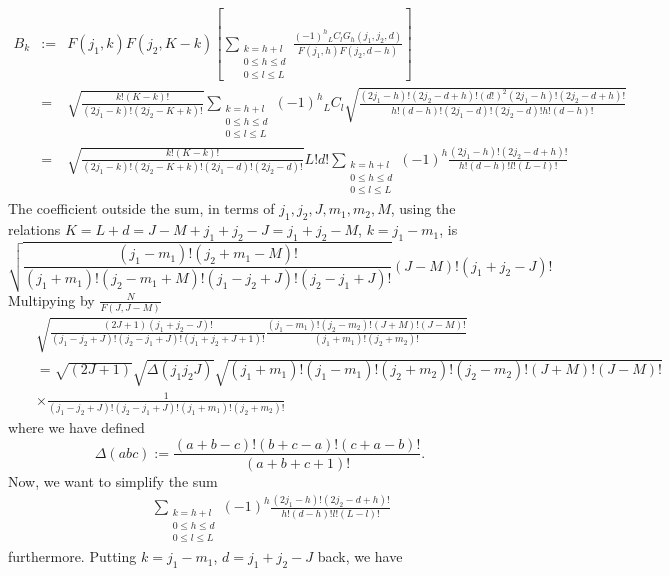 \documentclass{article}
\begin{document}
{\begin{eqnarray}
B_k & := & F(j_1,k)F(j_2,K-k) \left[ \sum_{\substack{k=h+l\\0\le h \le d\\0\le l \le L}} \frac{ (-1)^h {}_LC_{l}G_h(j_1,j_2,d) }{F(j_1,h)F(j_2,d-h)}\right] \nonumber\\
 & = & \sqrt{\frac{k!(K-k)!}{(2j_1 -k)!(2j_2-K+k)!}}  \sum_{\substack{k=h+l\\0\le h \le d\\0\le l \le L}}  (-1)^h {}_LC_{l}\sqrt{\frac{(2j_1-h)!(2j_2-d+h)!(d!)^2(2j_1-h)!(2j_2-d+h)!}{h!(d-h)!(2j_1-d)!(2j_2-d)!h!(d-h)!}}  \nonumber \\
 &=& \sqrt{\frac{k!(K-k)!}{(2j_1 -k)!(2j_2-K+k)!(2j_1-d)!(2j_2-d)!}} L!d!\sum_{\substack{k=h+l\\0\le h \le d\\0\le l \le L}}  (-1)^h \frac{(2j_1-h)!(2j_2-d+h)!}{h!(d-h)!l!(L-l)!} \nonumber 
\end{eqnarray}
The coefficient outside the sum, in terms of $j_1,j_2,J,m_1,m_2,M$, using the relations $K=L+d = J- M + j_1 + j_2 -J = j_1 +j_2 -M$, $k=j_1-m_1$, is
\begin{equation}
\label{ }
\sqrt{\frac{(j_1-m_1)!(j_2+m_1 -M)!}{(j_1 + m_1)!(j_2-m_1 +M )!(j_1-j_2 +J)!(j_2-j_1 +J)!}} (J-M)!(j_1+j_2-J)!
\end{equation}
Multipying by $\frac{N}{F(J,J-M)}$
\begin{eqnarray}
&&\sqrt{\frac{(2J+1)(j_1+j_2 -J)!}{(j_1-j_2 +J)!(j_2-j_1 +J)!(j_1+j_2+J+1)!}\frac{(j_1-m_1)!(j_2-m_2)!(J+M)!(J-M)!}{(j_1 + m_1)!(j_2+m_2 )!}} \nonumber\\
&& = \sqrt{(2J+1)}\sqrt{\Delta(j_1j_2J)}\sqrt{(j_1 + m_1)!(j_1-m_1)!(j_2+m_2 )!(j_2-m_2)!(J+M)!(J-M)!} \nonumber\\
&&\times\frac{1}{(j_1-j_2 +J)!(j_2-j_1 +J)!(j_1 + m_1)!(j_2+m_2 )!}
\end{eqnarray}
where we have defined
\begin{equation}
\label{ }
\Delta(abc) := \frac{(a+b-c)!(b+c-a)!(c+a-b)!}{(a+b+c+1)!}.
\end{equation}
Now, we want to simplify the sum
\begin{eqnarray}
&&\sum_{\substack{k=h+l\\0\le h \le d\\0\le l \le L}}  (-1)^h \frac{(2j_1-h)!(2j_2-d+h)!}{h!(d-h)!l!(L-l)!}
\end{eqnarray}
furthermore. Putting $k = j_1- m_1$, $d= j_1 + j_2 -J$ back, we have
\begin{eqnarray}

\end{eqnarray}}
\end{document}
